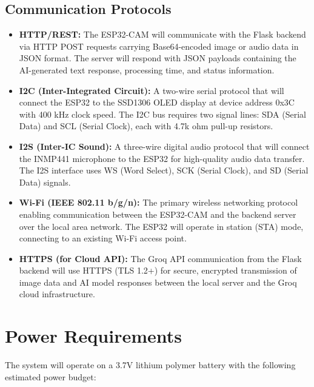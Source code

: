 \subsection{Communication Protocols}
\begin{itemize}[leftmargin=1.5cm]
\item \textbf{HTTP/REST:} The ESP32-CAM will communicate with the Flask backend via HTTP POST requests carrying Base64-encoded image or audio data in JSON format. The server will respond with JSON payloads containing the AI-generated text response, processing time, and status information.

\item \textbf{I2C (Inter-Integrated Circuit):} A two-wire serial protocol that will connect the ESP32 to the SSD1306 OLED display at device address 0x3C with 400 kHz clock speed. The I2C bus requires two signal lines: SDA (Serial Data) and SCL (Serial Clock), each with 4.7k ohm pull-up resistors.

\item \textbf{I2S (Inter-IC Sound):} A three-wire digital audio protocol that will connect the INMP441 microphone to the ESP32 for high-quality audio data transfer. The I2S interface uses WS (Word Select), SCK (Serial Clock), and SD (Serial Data) signals.

\item \textbf{Wi-Fi (IEEE 802.11 b/g/n):} The primary wireless networking protocol enabling communication between the ESP32-CAM and the backend server over the local area network. The ESP32 will operate in station (STA) mode, connecting to an existing Wi-Fi access point.

\item \textbf{HTTPS (for Cloud API):} The Groq API communication from the Flask backend will use HTTPS (TLS 1.2+) for secure, encrypted transmission of image data and AI model responses between the local server and the Groq cloud infrastructure.
\end{itemize}

\section{Power Requirements}
The system will operate on a 3.7V lithium polymer battery with the following estimated power budget:

